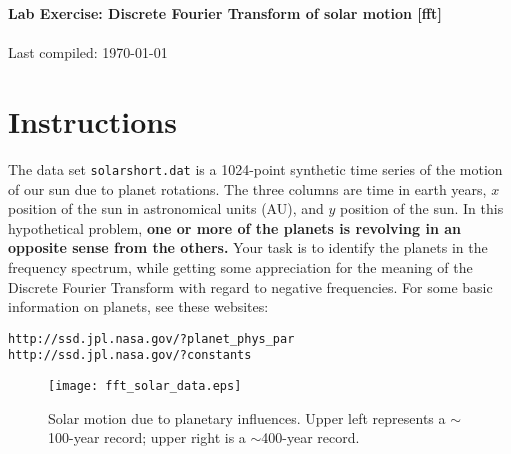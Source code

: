 \documentclass[11pt,titlepage,fleqn]{article}
\begin{document}

\begin{spacing}{1.2}
\centering
{\large \bf Lab Exercise: Discrete Fourier Transform of solar motion [fft]} \\
\cltag\ \\
Last compiled: \today \\
\end{spacing}


\section*{Instructions}

The data set \verb+solarshort.dat+ is a 1024-point synthetic time series of the motion of our sun due to planet rotations. The three columns are time in earth years, $x$ position of the sun in astronomical units (AU), and $y$ position of the sun. In this hypothetical problem, {\bf one or more of the planets is revolving in an opposite sense from the others.} Your task is to identify the planets in the frequency spectrum, while getting some appreciation for the meaning of the Discrete Fourier Transform with regard to negative frequencies. For some basic information on planets, see these websites:
%
\begin{verbatim}
http://ssd.jpl.nasa.gov/?planet_phys_par
http://ssd.jpl.nasa.gov/?constants
\end{verbatim}

\begin{figure}[h]
\centering
\texttt{[image: fft\_solar\_data.eps]}
\caption[]
{{
Solar motion due to planetary influences. Upper left represents a $\sim$100-year record; upper right is a $\sim$400-year record.
\label{fig:solar}
}}
\end{figure}

\end{document}
